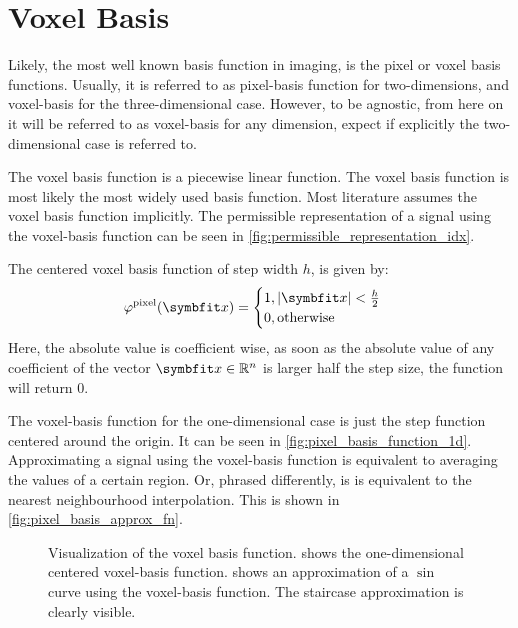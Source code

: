 \section{Voxel Basis}\label{sec:voxel_basis}

Likely, the most well known basis function in imaging, is the pixel or voxel basis functions.
Usually, it is referred to as pixel-basis function for two-dimensions, and voxel-basis for the
three-dimensional case. However, to be agnostic, from here on it will be referred to as voxel-basis
for any dimension, expect if explicitly the two-dimensional case is referred to.

The voxel basis function is a piecewise linear function. The voxel basis function is most likely the
most widely used basis function. Most literature assumes the voxel basis function implicitly. The
permissible representation of a signal using the voxel-basis function can be seen in
\autoref{fig:permissible_representation_idx}.

The centered voxel basis function of step width \(h\), is given by:
\begin{equation}\label{eq:voxel_basis_fn}
	\varphi^{\text{pixel}}(\mvec{x}) =
	\begin{cases}
		1, \abs{\mvec{x}} < \frac{h}{2} \\
		0, \text{otherwise}
	\end{cases}
\end{equation}
Here, the absolute value is coefficient wise, as soon as the absolute value of any coefficient of
the vector \(\mvec{x} \in \mathbb{R}^n\) is larger half the step size, the function will return
\(0\).

The voxel-basis function for the one-dimensional case is just the step function centered around the
origin. It can be seen in \autoref{fig:pixel_basis_function_1d}. Approximating a signal using the
voxel-basis function is equivalent to averaging the values of a certain region. Or, phrased
differently, is is equivalent to the nearest neighbourhood interpolation. This is shown in
\autoref{fig:pixel_basis_approx_fn}.

\begin{figure}
	\centering
	\caption{Visualization of the voxel basis function. 
		shows the one-dimensional centered voxel-basis function.
		 shows an approximation of a \(\sin\) curve using
		the voxel-basis function. The staircase approximation is clearly visible.
	}\label{fig:pixel_basis_function}
\end{figure}

